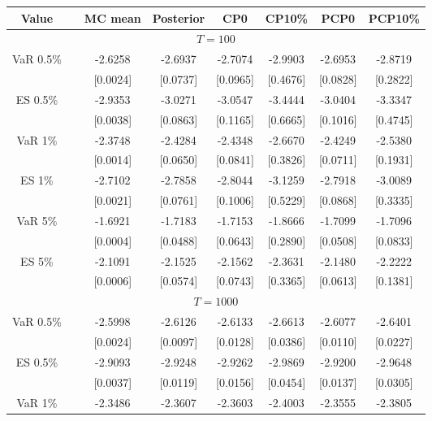 { \renewcommand{\arraystretch}{1.2} 
{\footnotesize 
\begin{table} 
\center 
\begin{tabular}{cc cccccc} 
Value & & MC mean & Posterior & CP0  & CP10\% & PCP0  & PCP10\% \\ \hline 
\hline 
\multicolumn{8}{c}{$T =100$}  \\ 
\hline 
\rowcolor{LightCyan} 
VaR 0.5\% && -2.6258 & -2.6937 & -2.7074 & -2.9903 & -2.6953 & -2.8719 \\ 
  && [0.0024] & [0.0737] & [0.0965] & [0.4676] & [0.0828] & [0.2822] \\ 
\rowcolor{LightCyan} 
ES 0.5\% && -2.9353 & -3.0271 & -3.0547 & -3.4444 & -3.0404 & -3.3347 \\ 
  && [0.0038] & [0.0863] & [0.1165] & [0.6665] & [0.1016] & [0.4745] \\ [1ex]
\rowcolor{LightCyan} 
VaR 1\% && -2.3748 & -2.4284 & -2.4348 & -2.6670 & -2.4249 & -2.5380 \\ 
  && [0.0014] & [0.0650] & [0.0841] & [0.3826] & [0.0711] & [0.1931] \\ 
\rowcolor{LightCyan} 
ES 1\% && -2.7102 & -2.7858 & -2.8044 & -3.1259 & -2.7918 & -3.0089 \\ 
  && [0.0021] & [0.0761] & [0.1006] & [0.5229] & [0.0868] & [0.3335] \\ [1ex]
\rowcolor{LightCyan} 
VaR 5\% && -1.6921 & -1.7183 & -1.7153 & -1.8666 & -1.7099 & -1.7096 \\ 
 && [0.0004] & [0.0488] & [0.0643] & [0.2890] & [0.0508] & [0.0833] \\ 
\rowcolor{LightCyan} 
ES 5\% && -2.1091 & -2.1525 & -2.1562 & -2.3631 & -2.1480 & -2.2222 \\ 
 && [0.0006] & [0.0574] & [0.0743] & [0.3365] & [0.0613] & [0.1381] \\ 
\hline 
\multicolumn{8}{c}{$T =1000$}  \\ 
\hline 
\rowcolor{LightCyan} 
VaR 0.5\% && -2.5998 & -2.6126 & -2.6133 & -2.6613 & -2.6077 & -2.6401 \\ 
  && [0.0024] & [0.0097] & [0.0128] & [0.0386] & [0.0110] & [0.0227] \\ 
\rowcolor{LightCyan} 
ES 0.5\% && -2.9093 & -2.9248 & -2.9262 & -2.9869 & -2.9200 & -2.9648 \\ 
  && [0.0037] & [0.0119] & [0.0156] & [0.0454] & [0.0137] & [0.0305] \\ [1ex]
\rowcolor{LightCyan} 
VaR 1\% && -2.3486 & -2.3607 & -2.3603 & -2.4003 & -2.3555 & -2.3805 \\ 

\end{tabular}
\end{table}}}
